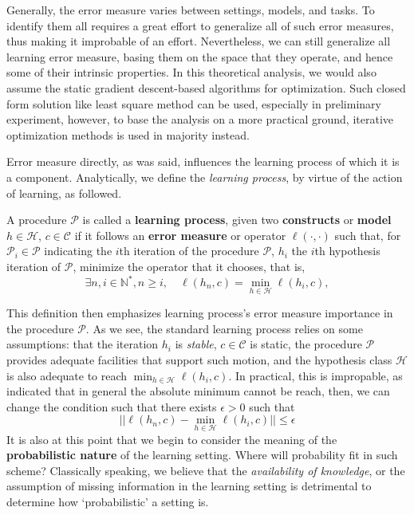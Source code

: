 \documentclass[10pt,oneside,oldfontcommands,dvipsnames,article]{memoir}
\begin{document}
Generally, the error measure varies between settings, models, and tasks. To identify them all requires a great effort to generalize all of such error measures, thus making it improbable of an effort. Nevertheless, we can still generalize all learning error measure, basing them on the space that they operate, and hence some of their intrinsic properties. In this theoretical analysis, we would also assume the static gradient descent-based algorithms for optimization. Such closed form solution like least square method can be used, especially in preliminary experiment, however, to base the analysis on a more practical ground, iterative optimization methods is used in majority instead. 

Error measure directly, as was said, influences the learning process of which it is a component. Analytically, we define the \textit{learning process}, by virtue of the action of learning, as followed. 
\begin{definition}
  A procedure $\mathcal{P}$ is called a \textbf{learning process}, given two \textbf{constructs} or \textbf{model} $h\in \mathcal{H}$, $c\in \mathcal{C}$ if it follows an \textbf{error measure} or operator $\ell(\cdot, \cdot)$ such that, for $\mathcal{P}_{i}\in \mathcal{P}$ indicating the $i$th iteration of the procedure $\mathcal{P}$, $h_{i}$ the $i$th hypothesis iteration of $\mathcal{P}$, minimize the operator that it chooses, that is,
  \begin{equation}
    \exists n,i\in \mathbb{N}^{*}, n \geq i,  \quad  \ell(h_{n},c) = \min_{h\in \mathcal{H}}\ell(h_{i},c), 
  \end{equation} 
\end{definition}
This definition then emphasizes learning process's error measure importance in the procedure $\mathcal{P}$. As we see, the standard learning process relies on some assumptions: that the iteration $h_{i}$ is \textit{stable}, $c\in \mathcal{C}$ is static, the procedure $\mathcal{P}$ provides adequate facilities that support such motion, and the hypothesis class $\mathcal{H}$ is also adequate to reach $\min_{h\in\mathcal{H}}\ell (h_{i},c)$. In practical, this is impropable, as \cite{10.5555/2371238} indicated that in general the absolute minimum cannot be reach, then, we can change the condition such that there exists $\epsilon > 0$ such that 
\begin{equation}
  \lvert \lvert \ell(h_{n},c) - \min_{h\in \mathcal{H}}\ell(h_{i},c)\rvert \rvert \leq \epsilon
\end{equation}
It is also at this point that we begin to consider the meaning of the \textbf{probabilistic nature} of the learning setting. Where will probability fit in such scheme? Classically speaking, we believe that the \textit{availability of knowledge}, or the assumption of missing information in the learning setting is detrimental to determine how `probabilistic' a setting is. 
\end{document}
